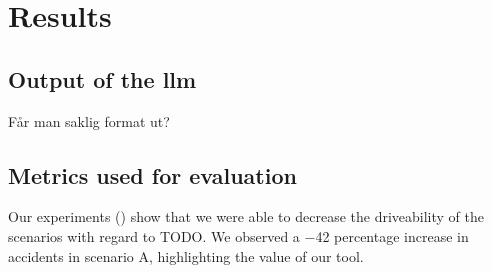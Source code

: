 \chapter{Results}\label{sec:results}

\section{Output of the \acrshort{llm}}

Får man saklig format ut?

\section{Metrics used for evaluation}

Our experiments () show that we were able to decrease the driveability of the
scenarios with regard to TODO. We observed a \num{-42} percentage increase in accidents in scenario
A, highlighting the value of our tool.